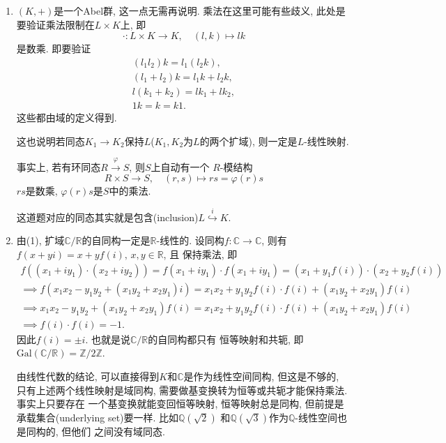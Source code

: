 \begin{solution}
\begin{enumerate}[(1)]
    \item $(K, +)$是一个Abel群, 这一点无需再说明. 乘法在这里可能有些歧义,
    此处是要验证乘法限制在$L \times K$上, 即
    \[
        \cdot: L \times K \to K, \quad (l, k) \mapsto lk
    \]
    是数乘. 即要验证
    \[
    \begin{gathered}
        (l_1l_2)k = l_1(l_2k),\\
        (l_1 + l_2)k = l_1k + l_2k,\\
        l(k_1 + k_2) = lk_1 + lk_2,\\
        1k = k = k1.
    \end{gathered}
    \]
    这些都由域的定义得到.

    这也说明若同态$K_1 \to K_2$保持$L$($K_1, K_2$为$L$的两个扩域),
    则一定是$L$-线性映射.

    事实上, 若有环同态$R \overset{\varphi}\to S$, 则$S$上自动有一个
    $R$-模结构
    \[
        R \times S \to S, \quad (r, s) \mapsto rs = \varphi(r)s
    \]
    $rs$是数乘, $\varphi(r)s$是$S$中的乘法.
    
    这道题对应的同态其实就是包含(inclusion)$L \overset{i}\hookrightarrow K$.
    \item 由(1), 扩域$\mathbb{C}/\mathbb{R}$的自同构一定是$\mathbb{R}$-线性的.
    设同构$f: \mathbb{C} \to \mathbb{C}$, 则有
    $f(x + yi) = x + yf(i),\, x, y \in \mathbb{R}$, 且
    保持乘法, 即
    \[
    \begin{gathered}
        f\left((x_1 + iy_1) \cdot (x_2 + iy_2)\right) = f(x_1 + iy_1) \cdot f(x_1 + iy_1) = (x_1 + y_1f(i)) \cdot (x_2 + y_2f(i))\\
        \implies f\left(x_1x_2 - y_1y_2 + (x_1y_2 +x_2y_1)i\right) = x_1x_2 + y_1y_2f(i) \cdot f(i) + (x_1y_2 +x_2y_1)f(i)\\
        \implies x_1x_2 - y_1y_2 + (x_1y_2 +x_2y_1)f(i) = x_1x_2 + y_1y_2f(i) \cdot f(i) + (x_1y_2 +x_2y_1)f(i)\\
        \implies f(i) \cdot f(i) = -1.
    \end{gathered}  
    \]
    因此$f(i) = \pm i$. 也就是说$\mathbb{C}/\mathbb{R}$的自同构都只有
    恒等映射和共轭, 即$\mathrm{Gal}(\mathbb{C}/\mathbb{R}) = \mathbb{Z}/2\mathbb{Z}$.

    由线性代数的结论, 可以直接得到$K$和$\mathbb{C}$是作为线性空间同构, 但这是不够的,
    只有上述两个线性映射是域同构, 需要做基变换转为恒等或共轭才能保持乘法. 事实上只要存在
    一个基变换就能变回恒等映射, 恒等映射总是同构,
    但前提是承载集合(underlying set)要一样. 比如$\mathbb{Q}(\sqrt{2})$
    和$\mathbb{Q}(\sqrt{3})$作为$\mathbb{Q}$-线性空间也是同构的, 但他们
    之间没有域同态.


\end{enumerate}
\end{solution}

